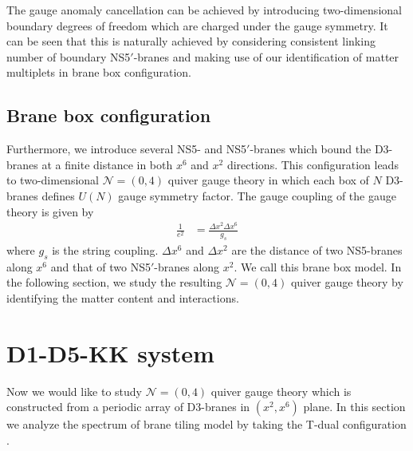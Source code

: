 \documentclass{article}
\numberwithin{equation}{section}
\begin{document}
The gauge anomaly cancellation can be achieved by introducing two-dimensional boundary degrees of freedom 
which are charged under the gauge symmetry. 
It can be seen that this is naturally achieved by considering consistent linking number 
of boundary NS5$'$-branes and making use of our identification of matter multiplets in brane box configuration. 











\subsection{Brane box configuration}
\label{sec_box}
Furthermore, we introduce several NS5- and NS5$'$-branes which bound the D3-branes 
at a finite distance in both $x^{6}$ and $x^{2}$ directions. 
This configuration leads to two-dimensional $\mathcal{N}=(0,4)$ quiver gauge theory in which 
each box of $N$ D3-branes defines $U(N)$ gauge symmetry factor. 
The gauge coupling of the gauge theory is given by 
\begin{align}
\label{coupling}
\frac{1}{e^{2}}&=
\frac{\Delta x^{2} \Delta x^{6}}{g_{s}}
\end{align}
where $g_{s}$ is the string coupling.  
$\Delta x^{6}$ and $\Delta x^{2}$ are the distance of two NS5-branes along $x^{6}$ and that of two NS5$'$-branes along $x^{2}$. 
We call this brane box model. 
In the following section, we study the resulting $\mathcal{N}=(0,4)$ quiver gauge theory 
by identifying the matter content and interactions. 




























\section{D1-D5-KK system}
\label{sec_d1d5kk}
Now we would like to study $\mathcal{N}=(0,4)$ quiver gauge theory 
which is constructed from a periodic array of D3-branes in $(x^2, x^6)$ plane. 
In this section we analyze the spectrum of brane tiling model 
by taking the T-dual configuration \cite{Hanany:1998it}. 
\end{document}
